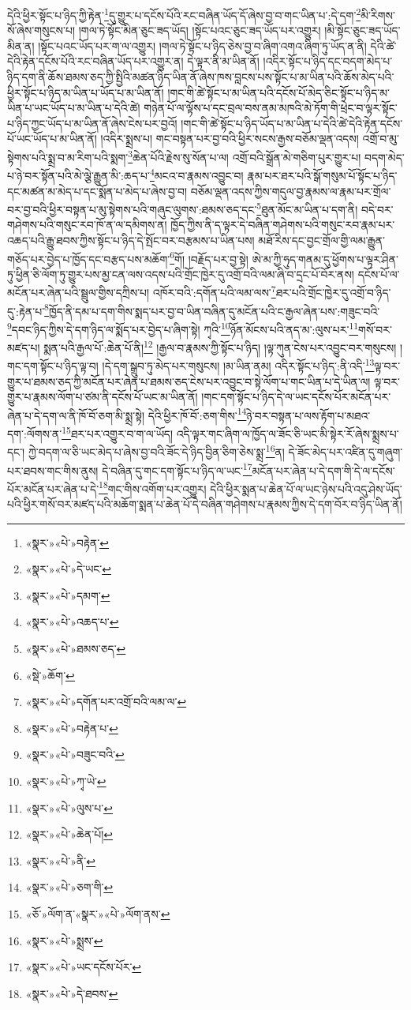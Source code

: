 དེའི་ཕྱིར་སྟོང་པ་ཉིད་ཀྱི་རྟེན་\footnote{«སྣར་»«པེ་»བརྟེན་}དུ་གྱུར་པ་དངོས་པོའི་རང་བཞིན་ཡོད་དོ་ཞེས་བྱ་བ་གང་ཡིན་པ་:དེ་དག་\footnote{«སྣར་»«པེ་»དེ་ཡང་}མི་རིགས་སོ་ཞེས་གསུངས་པ། །གལ་ཏེ་སྟོང་མིན་ཅུང་ཟད་ཡོད། །སྟོང་པའང་ཅུང་ཟད་ཡོད་པར་འགྱུར། །མི་སྟོང་ཅུང་ཟད་ཡོད་མིན་ན། །སྟོང་པའང་ཡོད་པར་ག་ལ་འགྱུར། །གལ་ཏེ་སྟོང་པ་ཉིད་ཅེས་བྱ་བ་ཞིག་འགའ་ཞིག་ཏུ་ཡོད་ན་ནི། དེའི་ཚེ་དེའི་རྟེན་དངོས་པོའི་རང་བཞིན་ཡོད་པར་འགྱུར་ན། དེ་ལྟར་ནི་མ་ཡིན་ནོ། །འདིར་སྟོང་པ་ཉིད་དང་བདག་མེད་པ་ཉིད་དག་ནི་ཆོས་ཐམས་ཅད་ཀྱི་སྤྱིའི་མཚན་ཉིད་ཡིན་ནོ་ཞེས་ཁས་བླངས་པས་སྟོང་པ་མ་ཡིན་པའི་ཆོས་མེད་པའི་ཕྱིར་སྟོང་པ་ཉིད་མ་ཡིན་པ་ཡོད་པ་མ་ཡིན་ནོ། །གང་གི་ཚེ་སྟོང་པ་མ་ཡིན་པའི་དངོས་པོ་མེད་ཅིང་སྟོང་པ་ཉིད་མ་ཡིན་པ་ཡང་ཡོད་པ་མ་ཡིན་པ་དེའི་ཚེ། གཉེན་པོ་ལ་ལྟོས་པ་དང་བྲལ་བས་ནམ་མཁའི་མེ་ཏོག་གི་ཕྲེང་བ་ལྟར་སྟོང་པ་ཉིད་ཀྱང་ཡོད་པ་མ་ཡིན་ནོ་ཞེས་ངེས་པར་བྱའོ། །གང་གི་ཚེ་སྟོང་པ་ཉིད་ཡོད་པ་མ་ཡིན་པ་དེའི་ཚེ་དེའི་རྟེན་དངོས་པོ་ཡང་ཡོད་པ་མ་ཡིན་ནོ། །འདིར་སྨྲས་པ། གང་བསྟན་པར་བྱ་བའི་ཕྱིར་སངས་རྒྱས་བཅོམ་ལྡན་འདས། འགྲོ་བ་མུ་སྟེགས་པའི་སྨྲ་བ་མ་རིག་པའི་སྨག་\footnote{«སྣར་»«པེ་»དམག་}ཆེན་པོའི་རྗེས་སུ་སོན་པ་ལ། འགྲོ་བའི་སྒྲོན་མེ་གཅིག་པུར་གྱུར་པ། བདག་མེད་པ་ཉེ་བར་སྟོན་པའི་མེ་ལྕེ་རྒྱུན་མི་:ཆད་པ་\footnote{«སྣར་»«པེ་»འཆད་པ་}མངའ་བ་རྣམས་འབྱུང་བ། རྣམ་པར་ཐར་པའི་སྒོ་གསུམ་པོ་སྟོང་པ་ཉིད་དང་མཚན་མ་མེད་པ་དང་སྨོན་པ་མེད་པ་ཞེས་བྱ་བ། བཅོམ་ལྡན་འདས་ཀྱིས་གདུལ་བྱ་རྣམས་ལ་རྣམ་པར་གྲོལ་བར་བྱ་བའི་ཕྱིར་བསྟན་པ་མུ་སྟེགས་པའི་གཞུང་ལུགས་:ཐམས་ཅད་དང་\footnote{«སྣར་»«པེ་»ཐམས་ཅད་}ཐུན་མོང་མ་ཡིན་པ་དག་ནི། བདེ་བར་གཤེགས་པའི་གསུང་རབ་ཁོ་ན་ལ་དམིགས་ན། ཁྱོད་ཀྱིས་ནི་ད་ལྟར་དེ་བཞིན་གཤེགས་པའི་གསུང་རབ་རྣམ་པར་འཆད་པའི་རྒྱུ་ཐབས་ཀྱིས་སྟོང་པ་ཉིད་དེ་སྤོང་བར་བརྩམས་པ་ཡིན་པས། མཐོ་རིས་དང་བྱང་གྲོལ་གྱི་ལམ་རྒྱུན་གཅོད་པར་བྱེད་པ་ཁྱོད་དང་བརྩད་པས་མཆོག་\footnote{«སྡེ་»ཆོག་}གོ། །བརྗོད་པར་བྱ་སྟེ། ཨེ་མ་ཀྱི་ཧུད་གནམ་དུ་ཕྱོགས་པ་ལྟར་ཤིན་ཏུ་ཕྱིན་ཅི་ལོག་ཏུ་གྱུར་པས་མྱ་ངན་ལས་འདས་པའི་གྲོང་ཁྱེར་དུ་འགྲོ་བའི་ལམ་ཞི་བ་དྲང་པོ་བོར་ནས། དངོས་པོ་ལ་མངོན་པར་ཞེན་པའི་སྦྲུལ་གྱིས་དཀྲིས་པ། འཁོར་བའི་:དགོན་པའི་ལམ་ལས་\footnote{«སྣར་»«པེ་»དགོན་པར་འགྲོ་བའི་ལམ་ལ་}ཐར་པའི་གྲོང་ཁྱེར་དུ་འགྲོ་བ་ཉིད་དུ་:རྟེན་པ་\footnote{«སྣར་»«པེ་»བརྟེན་པ་}ཁྱོད་ནི་དམ་པ་དག་གིས་སྨད་པར་བྱ་བ་ཡིན་བཞིན་དུ་མངོན་པའི་ང་རྒྱལ་ཞེན་པས་:གཟུང་བའི་\footnote{«སྣར་»«པེ་»བཟུང་བའི་}དབང་ཉིད་ཀྱིས་དེ་དག་ཉིད་ལ་སྨོད་པར་བྱེད་པ་ཞིག་སྟེ། ཀྭའི་\footnote{«སྣར་»«པེ་»ཀྭ་ཡེ་}ཉོན་མོངས་པའི་ནད་མ་:ལུས་པར་\footnote{«སྣར་»«པེ་»ལུས་པ་}གསོ་བར་མཛད་པ། སྨན་པའི་རྒྱལ་པོ་:ཆེན་པོ་ནི།\footnote{«སྣར་»«པེ་»ཆེན་པོ།} །རྒྱལ་བ་རྣམས་ཀྱི་སྟོང་པ་ཉིད། །ལྟ་ཀུན་ངེས་པར་འབྱུང་བར་གསུངས། །གང་དག་སྟོང་པ་ཉིད་ལྟ་བ། །དེ་དག་སྒྲུབ་ཏུ་མེད་པར་གསུངས། །མ་ཡིན་ནམ། འདིར་སྟོང་པ་ཉིད་:ནི་འདི་\footnote{«སྣར་»«པེ་»ནི་}ལྟ་བར་གྱུར་པ་ཐམས་ཅད་ཀྱི་མངོན་པར་ཞེན་པ་ཐམས་ཅད་ངེས་པར་འབྱུང་བ་སྟེ་ལོག་པ་གང་ཡིན་པ་དེ་ཡིན་ལ། ལྟ་བར་གྱུར་པ་རྣམས་ལོག་པ་ཙམ་ནི་དངོས་པོ་ཡང་མ་ཡིན་ནོ། །གང་དག་སྟོང་པ་ཉིད་དེ་ལ་ཡང་དངོས་པོར་མངོན་པར་ཞེན་པ་དེ་དག་ལ་ནི་ཁོ་བོ་ཅག་མི་སྨྲ་སྟེ། དེའི་ཕྱིར་ཁོ་བོ་:ཅག་གིས་\footnote{«སྣར་»«པེ་»ཅག་གི་}ཉེ་བར་བསྟན་པ་ལས་རྟོག་པ་མཐའ་དག་:ལོགས་ན་\footnote{«ཅོ་»ལོག་ན་«སྣར་»«པེ་»ལོག་ནས་}ཐར་པར་འགྱུར་བ་ག་ལ་ཡོད། འདི་ལྟར་གང་ཞིག་ལ་ཁྱོད་ལ་ཟོང་ཅི་ཡང་མི་སྟེར་རོ་ཞེས་སྨྲས་པ་དང་། ཀྱེ་བདག་ལ་ཅི་ཡང་མེད་པ་ཞེས་བྱ་བའི་ཟོང་དེ་ཉིད་བྱིན་ཅིག་ཅེས་སྨྲ་\footnote{«སྣར་»«པེ་»སྨྲས་}ན། དེ་ཟོང་མེད་པར་འཛིན་དུ་གཞུག་པར་ཐབས་གང་གིས་ནུས། དེ་བཞིན་དུ་གང་དག་སྟོང་པ་ཉིད་ལ་ཡང་\footnote{«སྣར་»«པེ་»ཡང་དངོས་པོར་}མངོན་པར་ཞེན་པ་དེ་དག་གི་དེ་ལ་དངོས་པོར་མངོན་པར་ཞེན་པ་དེ་\footnote{«སྣར་»«པེ་»དེ་ཐབས་}གང་གིས་འགོག་པར་འགྱུར། དེའི་ཕྱིར་སྨན་པ་ཆེན་པོ་ལ་ཡང་ཉེས་པའི་འདུ་ཤེས་ཡོད་པའི་ཕྱིར་གསོ་བར་མཛད་པའི་མཆོག་སྨན་པ་ཆེན་པོ་དེ་བཞིན་གཤེགས་པ་རྣམས་ཀྱིས་དེ་དག་བོར་བ་ཉིད་ཡིན་ནོ། 